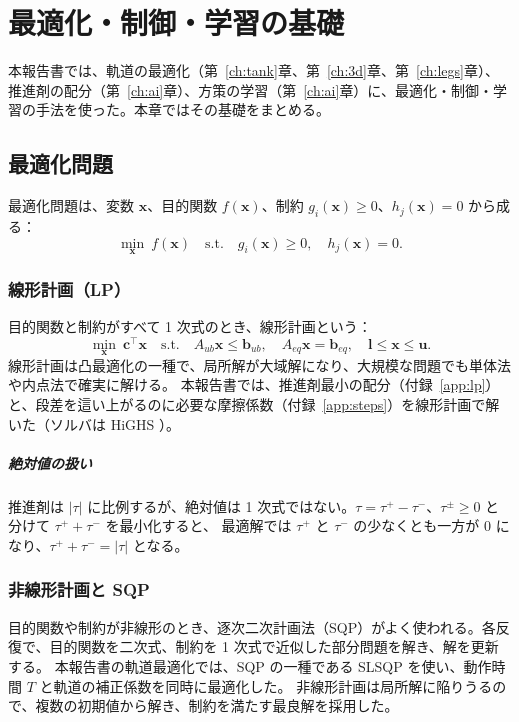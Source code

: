 \chapter{最適化・制御・学習の基礎}\label{ch:basics-opt}

本報告書では、軌道の最適化（第~\ref{ch:tank}章、第~\ref{ch:3d}章、第~\ref{ch:legs}章）、
推進剤の配分（第~\ref{ch:ai}章）、方策の学習（第~\ref{ch:ai}章）に、最適化・制御・学習の手法を使った。本章ではその基礎をまとめる。

\section{最適化問題}

最適化問題は、変数 $\bm x$、目的関数 $f(\bm x)$、制約 $g_i(\bm x)\ge0$、$h_j(\bm x)=0$ から成る：
\begin{equation}
\min_{\bm x}\ f(\bm x)\quad\text{s.t.}\quad g_i(\bm x)\ge0,\quad h_j(\bm x)=0 .
\end{equation}

\subsection{線形計画（LP）}

目的関数と制約がすべて 1 次式のとき、線形計画という：
\begin{equation}
\min_{\bm x}\ \bm c^\top\bm x\quad\text{s.t.}\quad A_{ub}\bm x\le\bm b_{ub},\quad A_{eq}\bm x=\bm b_{eq},\quad \bm l\le\bm x\le\bm u .
\end{equation}
線形計画は凸最適化の一種で、局所解が大域解になり、大規模な問題でも単体法や内点法で確実に解ける。
本報告書では、推進剤最小の配分（付録~\ref{app:lp}）と、段差を這い上がるのに必要な摩擦係数（付録~\ref{app:steps}）を線形計画で解いた（ソルバは HiGHS \cite{R25}）。

\paragraph{絶対値の扱い}
推進剤は $|\tau|$ に比例するが、絶対値は 1 次式ではない。$\tau = \tau^+ - \tau^-$、$\tau^\pm\ge0$ と分けて $\tau^++\tau^-$ を最小化すると、
最適解では $\tau^+$ と $\tau^-$ の少なくとも一方が 0 になり、$\tau^++\tau^- = |\tau|$ となる。

\subsection{非線形計画と SQP}

目的関数や制約が非線形のとき、逐次二次計画法（SQP）がよく使われる。各反復で、目的関数を二次式、制約を 1 次式で近似した部分問題を解き、解を更新する。
本報告書の軌道最適化では、SQP の一種である SLSQP \cite{R26} を使い、動作時間 $T$ と軌道の補正係数を同時に最適化した。
非線形計画は局所解に陥りうるので、複数の初期値から解き、制約を満たす最良解を採用した。

